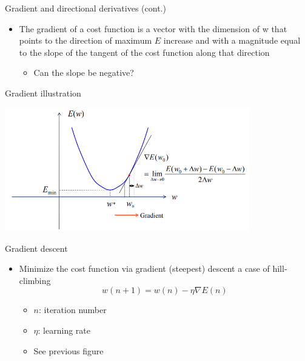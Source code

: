 \documentclass[notes]{beamer}
\providecommand{\tightlist}{%
  \setlength{\itemsep}{0pt}\setlength{\parskip}{0pt}}
\begin{document}
\begin{frame}{Gradient and directional derivatives (cont.)}

\begin{itemize}
\tightlist
\item
  The gradient of a cost function is a vector with the dimension of w
  that points to the direction of maximum \(E\) increase and with a
  magnitude equal to the slope of the tangent of the cost function along
  that direction

  \begin{itemize}
  \tightlist
  \item
    Can the slope be negative?
  \end{itemize}
\end{itemize}

\end{frame}

\begin{frame}{Gradient illustration}

\centering 

\includegraphics[width=0.80000\textwidth]{2018-03-10-09-23-28.png}\\

\end{frame}

\begin{frame}{Gradient descent}

\begin{itemize}
\item
  Minimize the cost function via gradient (steepest) descent a case of
  hill-climbing \[w( n + 1) = w( n ) − \eta \nabla E ( n )\]

  \begin{itemize}
  \tightlist
  \item
    \(n\): iteration number
  \item
    \(\eta\): learning rate
  \item
    See previous figure
  \end{itemize}
\end{itemize}

\end{frame}
\end{document}
